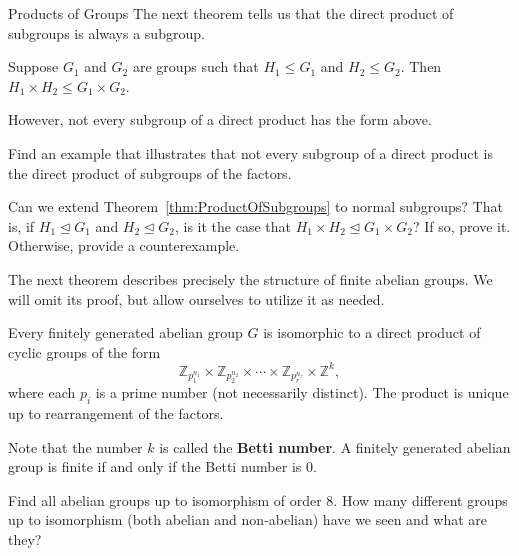 \begin{section}{Products of Groups}
The next theorem tells us that the direct product of subgroups is always a subgroup.

\begin{theorem}\label{thm:ProductOfSubgroups}
Suppose $G_1$ and $G_2$ are groups such that $H_1\leq G_1$ and $H_2\leq G_2$.  Then $H_1\times H_2\leq G_1\times G_2$.
\end{theorem}

However, not every subgroup of a direct product has the form above. 

\begin{problem}
Find an example that illustrates that not every subgroup of a direct product is the direct product of subgroups of the factors.
\end{problem}

\begin{problem}
Can we extend Theorem~\ref{thm:ProductOfSubgroups} to normal subgroups?  That is, if $H_1\trianglelefteq G_1$ and $H_2\trianglelefteq G_2$, is it the case that $H_1\times H_2\trianglelefteq G_1\times G_2$? If so, prove it.  Otherwise, provide a counterexample.
\end{problem}


The next theorem describes precisely the structure of finite abelian groups.  We will omit its proof, but allow ourselves to utilize it as needed.

\begin{theorem}
Every finitely generated abelian group $G$ is isomorphic to a direct product of cyclic groups of the form
\[
\mathbb{Z}_{p_1^{n_1}}\times \mathbb{Z}_{p_2^{n_2}}\times \cdots \times \mathbb{Z}_{p_r^{n_r}}\times \mathbb{Z}^k,
\]
where each $p_i$ is a prime number (not necessarily distinct).  The product is unique up to rearrangement of the factors.
\end{theorem}

Note that the number $k$ is called the \textbf{Betti number}.  A  finitely generated abelian group is finite if and only if the Betti number is 0.

\begin{problem}\label{prob:groupsOrder8}
Find all abelian groups up to isomorphism of order 8.  How many different groups up to isomorphism (both abelian and non-abelian) have we seen and what are they?
\end{problem}


\end{section}
